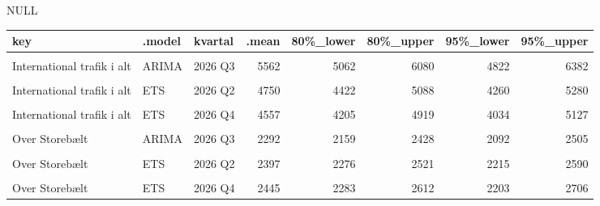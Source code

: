 \documentclass[
  danish,
]{article}
\begin{document}
\begin{table}
{NULL

\centering
\begin{tabular}[t]{lllrrrrr}
\toprule
key & .model & kvartal & .mean & 80\%\_lower & 80\%\_upper & 95\%\_lower & 95\%\_upper\\
\midrule
\cellcolor{gray!10}{International trafik i alt} & \cellcolor{gray!10}{ARIMA} & \cellcolor{gray!10}{2026 Q2} & \cellcolor{gray!10}{5034} & \cellcolor{gray!10}{4688} & \cellcolor{gray!10}{5390} & \cellcolor{gray!10}{4518} & \cellcolor{gray!10}{5592}\\
International trafik i alt & ARIMA & 2026 Q3 & 5562 & 5062 & 6080 & 4822 & 6382\\
\cellcolor{gray!10}{International trafik i alt} & \cellcolor{gray!10}{ARIMA} & \cellcolor{gray!10}{2026 Q4} & \cellcolor{gray!10}{4626} & \cellcolor{gray!10}{4211} & \cellcolor{gray!10}{5057} & \cellcolor{gray!10}{4011} & \cellcolor{gray!10}{5309}\\
International trafik i alt & ETS & 2026 Q2 & 4750 & 4422 & 5088 & 4260 & 5280\\
\cellcolor{gray!10}{International trafik i alt} & \cellcolor{gray!10}{ETS} & \cellcolor{gray!10}{2026 Q3} & \cellcolor{gray!10}{5222} & \cellcolor{gray!10}{4838} & \cellcolor{gray!10}{5617} & \cellcolor{gray!10}{4651} & \cellcolor{gray!10}{5843}\\
\addlinespace
International trafik i alt & ETS & 2026 Q4 & 4557 & 4205 & 4919 & 4034 & 5127\\
\cellcolor{gray!10}{Over Storebælt} & \cellcolor{gray!10}{ARIMA} & \cellcolor{gray!10}{2026 Q2} & \cellcolor{gray!10}{2356} & \cellcolor{gray!10}{2244} & \cellcolor{gray!10}{2471} & \cellcolor{gray!10}{2187} & \cellcolor{gray!10}{2534}\\
Over Storebælt & ARIMA & 2026 Q3 & 2292 & 2159 & 2428 & 2092 & 2505\\
\cellcolor{gray!10}{Over Storebælt} & \cellcolor{gray!10}{ARIMA} & \cellcolor{gray!10}{2026 Q4} & \cellcolor{gray!10}{2454} & \cellcolor{gray!10}{2300} & \cellcolor{gray!10}{2611} & \cellcolor{gray!10}{2224} & \cellcolor{gray!10}{2700}\\
Over Storebælt & ETS & 2026 Q2 & 2397 & 2276 & 2521 & 2215 & 2590\\
\addlinespace
\cellcolor{gray!10}{Over Storebælt} & \cellcolor{gray!10}{ETS} & \cellcolor{gray!10}{2026 Q3} & \cellcolor{gray!10}{2297} & \cellcolor{gray!10}{2161} & \cellcolor{gray!10}{2436} & \cellcolor{gray!10}{2094} & \cellcolor{gray!10}{2514}\\
Over Storebælt & ETS & 2026 Q4 & 2445 & 2283 & 2612 & 2203 & 2706\\
\bottomrule
\end{tabular}

}

\end{table}%
\end{document}
